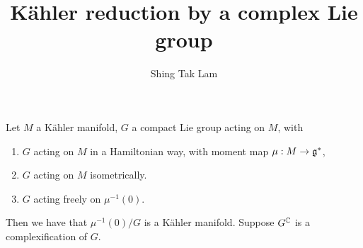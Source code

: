 \documentclass{article}
\title{K\"ahler reduction by a complex Lie group}
\author{Shing Tak Lam}
\begin{document}
\maketitle

Let \(M\) a K\"ahler manifold, \(G\) a compact Lie group acting on \(M\), with

\begin{enumerate}
    \item \(G\) acting on \(M\) in a Hamiltonian way, with moment map \(\mu : M \to \mathfrak{g}^*\),
    \item \(G\) acting on \(M\) isometrically.
    \item \(G\) acting freely on \(\mu^{-1}(0)\).
\end{enumerate}

Then we have that \(\mu^{-1}(0)/G\) is a K\"ahler manifold. Suppose \(G^{\mathbb{C}}\) is a complexification of \(G\).
\end{document}

